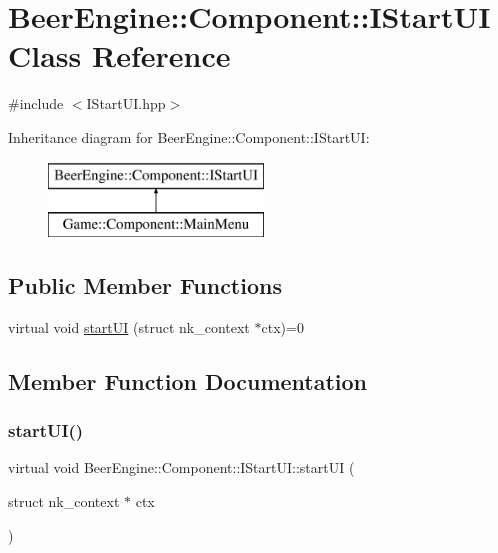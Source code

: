 \hypertarget{class_beer_engine_1_1_component_1_1_i_start_u_i}{}\section{Beer\+Engine\+:\+:Component\+:\+:I\+Start\+UI Class Reference}
\label{class_beer_engine_1_1_component_1_1_i_start_u_i}


{\ttfamily \#include $<$I\+Start\+U\+I.\+hpp$>$}

Inheritance diagram for Beer\+Engine\+:\+:Component\+:\+:I\+Start\+UI\+:\begin{figure}[H]
\begin{center}
\leavevmode
\includegraphics[height=2.000000cm]{class_beer_engine_1_1_component_1_1_i_start_u_i}
\end{center}
\end{figure}
\subsection*{Public Member Functions}
\begin{DoxyCompactItemize}
\item 
virtual void \mbox{\hyperlink{class_beer_engine_1_1_component_1_1_i_start_u_i_a95b739f21079f5f103da42ea34f826f2}{start\+UI}} (struct nk\+\_\+context $\ast$ctx)=0
\end{DoxyCompactItemize}


\subsection{Member Function Documentation}
\mbox{\label{class_beer_engine_1_1_component_1_1_i_start_u_i_a95b739f21079f5f103da42ea34f826f2}} 
\subsubsection{\texorpdfstring{start\+U\+I()}{startUI()}}
{\footnotesize\ttfamily virtual void Beer\+Engine\+::\+Component\+::\+I\+Start\+U\+I\+::start\+UI (\begin{DoxyParamCaption}\item[{struct nk\+\_\+context $\ast$}]{ctx }\end{DoxyParamCaption})\hspace{0.3cm}{\ttfamily [pure virtual]}}



